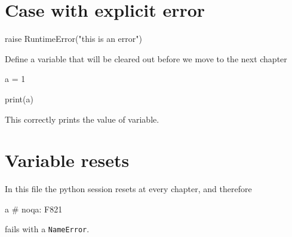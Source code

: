 \documentclass[oneside]{book}
\begin{document}
\chapter{Case with explicit error}

\begin{pycell}
raise RuntimeError("this is an error")
\end{pycell}

Define a variable that will be cleared out before we move to the next chapter

\begin{pycell}
a = 1
\end{pycell}

\begin{pycell}
print(a)
\end{pycell}

This correctly prints the value of variable.

\chapter{Variable resets}

In this file the python session resets at every chapter, and therefore

\begin{pycell}
a  # noqa: F821
\end{pycell}

fails with a \texttt{NameError}.

\ifPythonTeXLoaded
\else
\fi
\end{document}
